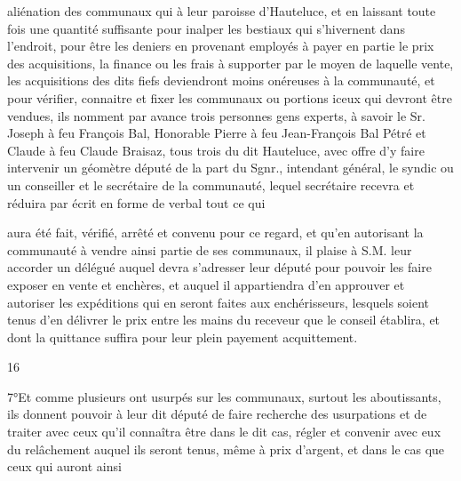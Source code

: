 \documentclass[a4paper,twoside,openany]{article}
\begin{document}

aliénation des communaux qui à leur paroisse
d’Hauteluce, et en laissant toute fois une quantité
suffisante pour inalper les bestiaux qui s’hivernent
dans l’endroit, pour être les deniers en provenant
employés à payer en partie le prix des acquisitions,
la finance ou les frais à supporter par le moyen de
laquelle vente, les acquisitions des dits fiefs deviendront
moins onéreuses à la communauté, et pour vérifier,
connaitre et fixer les communaux ou portions iceux
qui devront être vendues, ils nomment par avance
trois personnes gens experts, à savoir le Sr. Joseph
à feu François Bal, Honorable Pierre à feu Jean-François
Bal Pétré et Claude à feu Claude Braisaz, tous trois
du dit Hauteluce, avec offre d’y faire intervenir
un géomètre député de la part du Sgnr., intendant
général, le syndic ou un conseiller et le secrétaire
de la communauté, lequel secrétaire recevra et
réduira par écrit en forme de verbal tout ce qui



aura été fait, vérifié, arrêté et convenu pour ce
regard, et qu’en autorisant la communauté à vendre
ainsi partie de ses communaux, il plaise à S.M.
leur accorder un délégué auquel devra s’adresser
leur député pour pouvoir les faire exposer en vente
et enchères, et auquel il appartiendra d’en approuver et
autoriser les expéditions qui en seront faites aux
enchérisseurs, lesquels soient tenus d’en délivrer le
prix entre les mains du receveur que le conseil
établira, et dont la quittance suffira pour leur
plein payement acquittement.
\\
\begin{center}
16
\end{center}
7°Et comme plusieurs ont usurpés sur les communaux,
surtout les aboutissants, ils donnent pouvoir à
leur dit député de faire recherche des usurpations
et de traiter avec ceux qu’il connaîtra être dans
le dit cas, régler et convenir avec eux du
relâchement auquel ils seront tenus, même à prix
d’argent, et dans le cas que ceux qui auront ainsi
\end{document}
